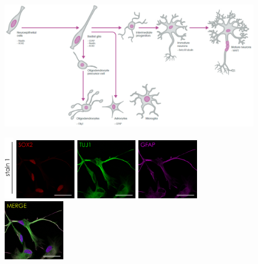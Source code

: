 \documentclass[onecolumn,10pt]{asme2ej}
\begin{document}
\begin{figure}[h]
	
	
	\includegraphics[width=\textwidth]{figures/neuron_marker}
	
	
	\includegraphics[width=0.035\textwidth]{figures/IF/charac(light)/stain1}
	\includegraphics[width=0.235\textwidth]{figures/IF/charac(light)/SOX2(14)TUJ}
	\includegraphics[width=0.235\textwidth]{figures/IF/charac(light)/TUJ1(14)TUJ}
	\includegraphics[width=0.235\textwidth]{figures/IF/charac(light)/GFAP(14)TUJ}
	\includegraphics[width=0.235\textwidth]{figures/IF/charac(light)/MERGE(14)TUJ}
	

\end{figure}
\end{document}

